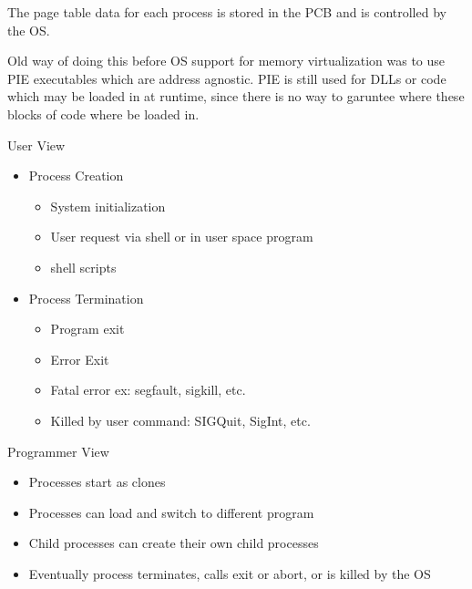 \documentclass{report}
\begin{document}
\begin{description}
\begin{itemize}
\begin{mdframed}
                    The page table data for each process is stored in the PCB and
                    is controlled by the OS.
                \end{mdframed}
                \begin{mdframed}
                    Old way of doing this before OS support for memory virtualization
                    was to use PIE executables which are address agnostic. PIE is still
                    used for DLLs or code which may be loaded in at runtime, since there
                    is no way to garuntee where these blocks of code where be loaded in.
                \end{mdframed}
        \end{itemize}
    \item User View
        \begin{itemize}
            \item Process Creation
                \begin{itemize}
                    \item System initialization
                    \item User request via shell or in user space program
                    \item shell scripts
                \end{itemize}
            \item Process Termination
                \begin{itemize}
                    \item Program exit
                    \item Error Exit
                    \item Fatal error ex: segfault, sigkill, etc.
                    \item Killed by user command: SIGQuit, SigInt, etc.
                \end{itemize}
        \end{itemize}
    \item Programmer View
        \begin{itemize}
            \item Processes start as clones
            \item Processes can load and switch to different program
            \item Child processes can create their own child processes
            \item Eventually process terminates, calls exit or abort, or is killed by the OS
        \end{itemize}
        
\end{description}
\end{document}
